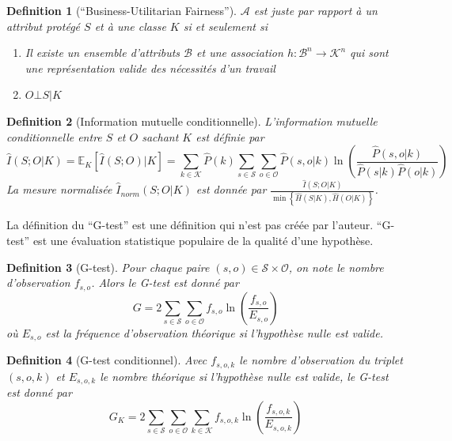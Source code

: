 \documentclass{article}
\newtheorem{myDef}{Definition}
\theoremstyle{definition}
\begin{document}
\begin{myDef}[``Business-Utilitarian Fairness'']
  \label{defBusiness}
  $\mathcal{A}$ est juste par rapport à un attribut protégé $S$ et à une classe $K$ si et seulement si
  \begin{enumerate}
  \item Il existe un ensemble d'attributs $\mathcal{B}$ et une association $h : \mathcal{B}^{n} \rightarrow \mathcal{K}^{n}$ qui sont une représentation valide des nécessités d'un travail
  \item $O \bot S | K$
  \end{enumerate}
\end{myDef}

\begin{myDef}[Information mutuelle conditionnelle]
  L'information mutuelle conditionnelle entre $S$ et $O$ sachant $K$ est définie par
  \[
  \hat{I}(S;O|K) = \mathbb{E}_{K}[\hat{I}(S;O)|K] = \sum_{k \in \mathcal{K}} \hat{P}(k) \sum_{s \in \mathcal{S}} \sum_{o \in \mathcal{O}} \hat{P}(s,o|k) \ln \left( \frac{\hat{P}(s,o|k)}{\hat{P}(s|k) \hat{P}(o|k)} \right)
  \]
  La mesure normalisée $\hat{I}_{norm}(S;O|K)$ est donnée par $\frac{\hat{I}(S;O|K)}{\min \left\{ \hat{H}(S|K), \hat{H}(O|K) \right\}}$.
\end{myDef}

La définition du ``G-test'' est une définition qui n'est pas créée par l'auteur. ``G-test'' est une évaluation statistique populaire de la qualité d'une hypothèse.
\begin{myDef}[G-test]
  Pour chaque paire $(s,o) \in \mathcal{S} \times \mathcal{O}$, on note le nombre d'observation $f_{s,o}$. Alors le G-test est donné par
  \[
  G = 2 \sum_{s \in \mathcal{S}} \sum_{o \in \mathcal{O}} f_{s,o} \ln \left( \frac{f_{s,o}}{E_{s,o}} \right)
  \]
  où $E_{s,o}$ est la fréquence d'observation théorique si l'hypothèse nulle est valide.
\end{myDef}

\begin{myDef}[G-test conditionnel]
  Avec $f_{s,o,k}$ le nombre d'observation du triplet $(s,o,k)$ et $E_{s,o,k}$ le nombre théorique si l'hypothèse nulle est valide, le G-test est donné par
  \[
  G_{K} = 2 \sum_{s \in \mathcal{S}} \sum_{o \in \mathcal{O}} \sum_{k \in \mathcal{K}} f_{s,o,k} \ln \left( \frac{f_{s,o,k}}{E_{s,o,k}} \right)
  \]
\end{myDef}


\end{document}
